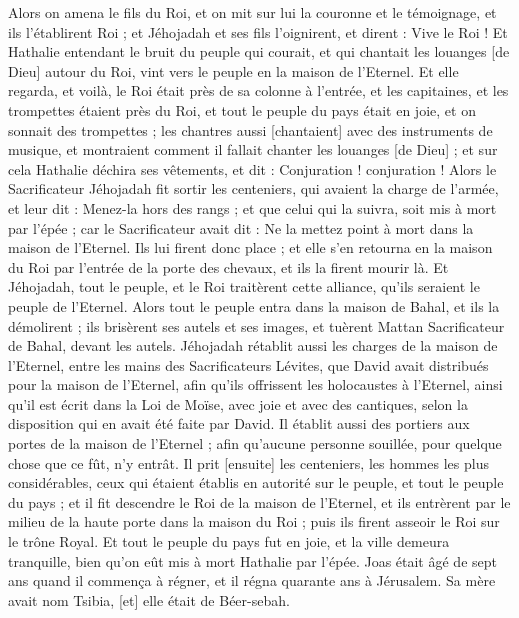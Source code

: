 \begin{multicols}{2}
Alors on amena le fils du Roi, et on mit sur lui la couronne et le témoignage, et ils l'établirent Roi ; et Jéhojadah et ses fils l'oignirent, et dirent : Vive le Roi !
Et Hathalie entendant le bruit du peuple qui courait, et qui chantait les louanges [de Dieu] autour du Roi, vint vers le peuple en la maison de l'Eternel.
Et elle regarda, et voilà, le Roi était près de sa colonne à l'entrée, et les capitaines, et les trompettes étaient près du Roi, et tout le peuple du pays était en joie, et on sonnait des trompettes ; les chantres aussi [chantaient] avec des instruments de musique, et montraient comment il fallait chanter les louanges [de Dieu] ; et sur cela Hathalie déchira ses vêtements, et dit : Conjuration ! conjuration !
Alors le Sacrificateur Jéhojadah fit sortir les centeniers, qui avaient la charge de l'armée, et leur dit : Menez-la hors des rangs ; et que celui qui la suivra, soit mis à mort par l'épée ; car le Sacrificateur avait dit : Ne la mettez point à mort dans la maison de l'Eternel.
Ils lui firent donc place ; et elle s'en retourna en la maison du Roi par l'entrée de la porte des chevaux, et ils la firent mourir là.
Et Jéhojadah, tout le peuple, et le Roi traitèrent cette alliance, qu'ils seraient le peuple de l'Eternel.
Alors tout le peuple entra dans la maison de Bahal, et ils la démolirent ; ils brisèrent ses autels et ses images, et tuèrent Mattan Sacrificateur de Bahal, devant les autels.
Jéhojadah rétablit aussi les charges de la maison de l'Eternel, entre les mains des Sacrificateurs Lévites, que David avait distribués pour la maison de l'Eternel, afin qu'ils offrissent les holocaustes à l'Eternel, ainsi qu'il est écrit dans la Loi de Moïse, avec joie et avec des cantiques, selon la disposition qui en avait été faite par David.
Il établit aussi des portiers aux portes de la maison de l'Eternel ; afin qu'aucune personne souillée, pour quelque chose que ce fût, n'y entrât.
Il prit [ensuite] les centeniers, les hommes les plus considérables, ceux qui étaient établis en autorité sur le peuple, et tout le peuple du pays ; et il fit descendre le Roi de la maison de l'Eternel, et ils entrèrent par le milieu de la haute porte dans la maison du Roi ; puis ils firent asseoir le Roi sur le trône Royal.
Et tout le peuple du pays fut en joie, et la ville demeura tranquille, bien qu'on eût mis à mort Hathalie par l'épée.
\VerseOne{}Joas était âgé de sept ans quand il commença à régner, et il régna quarante ans à Jérusalem. Sa mère avait nom Tsibia, [et] elle était de Béer-sebah.

\end{multicols}
